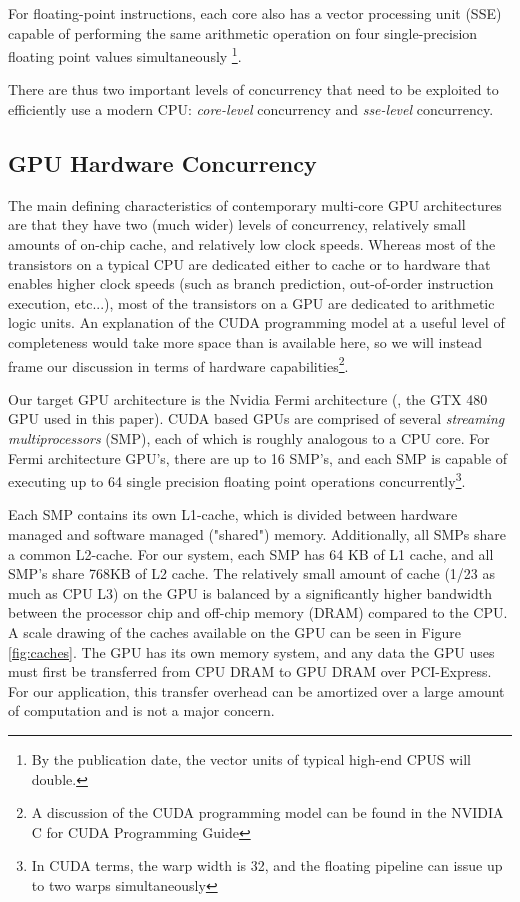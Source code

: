 \documentclass[10pt,twocolumn,letterpaper]{article}
\begin{document}
For floating-point instructions, each core also has a vector processing unit
(SSE) capable of performing the same arithmetic operation on four single-precision 
floating point values simultaneously \footnote{By the publication date, the vector
units of typical high-end CPUS will double.}.  

There are thus two important levels of concurrency that need to be exploited to
efficiently use a modern CPU: {\em core-level} concurrency and {\em sse-level}
concurrency. 

\subsection{GPU Hardware Concurrency}
The main defining characteristics of contemporary multi-core GPU architectures
are that they have two (much wider) levels of concurrency, relatively small amounts of
on-chip cache, and relatively low clock speeds.  Whereas most of the transistors on
a typical CPU are dedicated either to cache or to hardware that enables higher
clock speeds (such as branch prediction, out-of-order instruction execution, etc...),
most of the transistors on a GPU are dedicated to arithmetic logic units.
An explanation of the CUDA programming model at a useful level of completeness would take 
more space than is available here, so we will instead frame our discussion in terms of 
hardware capabilities\footnote{A discussion of the CUDA programming model can be found
in the NVIDIA C for CUDA Programming Guide}.

Our target GPU architecture is the Nvidia Fermi architecture (\eg, the GTX 480
GPU used in this paper).  CUDA based GPUs are comprised of several
\emph{streaming multiprocessors} (SMP), each of which is roughly analogous to a CPU core.
For Fermi architecture GPU's, there are up to 16 SMP's, and each SMP is capable of executing up to 64 single precision 
floating point operations
concurrently\footnote{In CUDA terms, the warp width is 32, and the floating pipeline can
issue up to two warps simultaneously}. 

Each SMP contains its own L1-cache, which is divided between hardware managed
and software managed ("shared") memory.  Additionally, all SMPs share a common
L2-cache.  For our system, each SMP has 64 KB of L1 cache, and all SMP's share
768KB of L2 cache. 
The relatively small amount
of cache (1/23 as much as CPU L3) on the GPU is balanced by a significantly
higher bandwidth between the processor chip and off-chip memory (DRAM) compared
to the CPU.  A scale drawing of the caches available on the GPU can be seen in Figure \ref{fig:caches}.
The GPU has its own memory system, and any data the GPU uses must first be
transferred from CPU DRAM to GPU DRAM over PCI-Express.  For our application,
this transfer overhead can be amortized over a large amount of computation and is
not a major concern.
\end{document}
